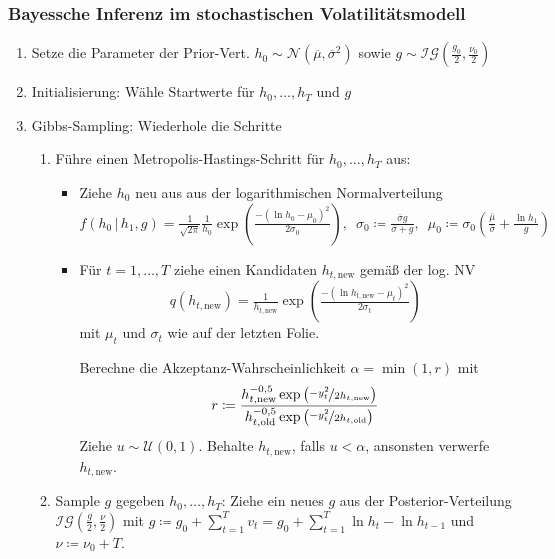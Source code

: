 \documentclass[10pt]{beamer}
\theoremstyle{definition}
\newcommand{\Normal}{\mathcal{N}} %
\newcommand{\Uniform}{\mathcal{U}} %
\newcommand{\InverseGamma}{\mathcal{IG}} %
\newcommand{\new}{\mathrm{new}} %
\newcommand{\old}{\mathrm{old}} %
\newcommand{\stepOne}[1]{\textcolor{StepOneColor}{#1}}
\newcommand{\stepTwo}[1]{\textcolor{StepTwoColor}{#1}}
\begin{document}
\begin{frame}[t]
  \frametitle{Bayessche Inferenz im stochastischen Volatilitätsmodell}
  \begin{enumerate}
    \item<2->[A.] Setze die Parameter der Prior-Vert. $h_0 \sim \Normal(\overline{\mu}, \overline{\sigma}^2)$ sowie $g \sim \InverseGamma(\tfrac{g_0}{2}, \tfrac{\nu_0}{2})$
    \item<3->[B.] Initialisierung: Wähle Startwerte für $h_0, \ldots, h_T$ und $g$
    \item<4->[C.] Gibbs-Sampling: Wiederhole die Schritte
    \begin{enumerate}
      \item<5->[\stepOne{1.}] Führe einen Metropolis-Hastings-Schritt für \stepOne{$h_0, \ldots, h_T$} aus:
      \begin{itemize}
        \item<6-> Ziehe $h_0$ neu aus aus der logarithmischen Normalverteilung
        \[
          f(h_0 \,|\, h_1, g) = \tfrac{1}{\sqrt{2 \pi}} \tfrac{1}{h_0} \exp \left( \tfrac{- (\ln h_0 - \mu_0)^2}{2 \sigma_0} \right), \enspace
          \sigma_0 \coloneqq \tfrac{\overline{\sigma} g}{\overline{\sigma} + g}, \enspace
          \mu_0 \coloneqq \sigma_0 \left( \tfrac{\overline{\mu}}{\overline{\sigma}} + \tfrac{\ln h_1}{g} \right)
        \]
        \item<7-> Für $t = 1, \ldots, T$ ziehe einen Kandidaten $h_{t, \new}$ gemäß der log. NV
        \[
          q(h_{t,\new}) = \tfrac{1}{h_{t, \new}} \exp \left( \tfrac{- (\ln h_{t, \new} - \mu_t)^2}{2 \sigma_t} \right)
        \]
        mit $\mu_t$ und $\sigma_t$ wie auf der letzten Folie.

        Berechne die Akzeptanz-Wahrscheinlichkeit $\alpha = \min(1, r)$ mit
        \[
          r \coloneqq \frac{h_{t,\new}^{-0,5} \exp \left( \nicefrac{-y_t^2}{2 h_{t, \new}} \right)}{h_{t,\old}^{-0,5} \exp \left( \nicefrac{-y_t^2}{2 h_{t, \old}} \right)}
        \]
        Ziehe $u \sim \Uniform(0,1)$. Behalte $h_{t, \new}$, falls $u < \alpha$, ansonsten verwerfe $h_{t, \new}$.
      \end{itemize}
      \item<8->[\stepTwo{2.}] Sample \stepTwo{$g$} gegeben \stepOne{$h_0, \ldots, h_T$}:
      Ziehe ein neues $g$ aus der Posterior-Verteilung $\InverseGamma(\tfrac{g}{2}, \tfrac{\nu}{2})$ mit $g \coloneqq g_0 + \sum_{t=1}^T v_t = g_0 + \sum_{t=1}^T \ln h_t - \ln h_{t-1}$ und $\nu \coloneqq \nu_0 + T$.
    \end{enumerate}
  \end{enumerate}
\end{frame}
\end{document}
